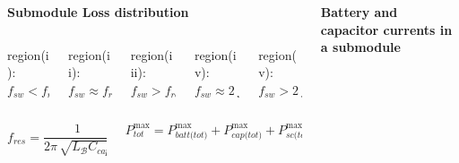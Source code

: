 \documentclass[20pt,t]{beamer}
\begin{document}
\begin{frame}
\begin{columns}[c]
\begin{column}{.49\textwidth}
\begin{beamerboxesrounded}[lower=white,upper=white,shadow=false]{\Large\bfseries Submodule Loss distribution}
\begin{columns}[T]
\begin{column}{0.1\textwidth}
							region(i):
							$f_{\textit{sw}} < f_{\textit{res}}$
						\end{column}
						\begin{column}{0.1\textwidth}
							region(ii):
							$f_{\textit{sw}} \approx f_{\textit{res}}$
						\end{column}
						\begin{column}{0.1\textwidth}
							region(iii):
							$f_{\textit{sw}} > f_{\textit{res}}$
						\end{column}
						\begin{column}{0.1\textwidth}
							region(iv):
							$f_{\textit{sw}} \approx 2\,f_{1}$
						\end{column}
						\begin{column}{0.1\textwidth}
							region(v):
							$f_{\textit{sw}} > 2\,f_{1}$
						\end{column}
					\end{columns}
					\begin{alertblock}{}
						\begin{columns}
							\begin{column}{0.4\textwidth}
								\[ f_{\textit{res}} = \frac{1}{2\pi\,\sqrt{\textit{L}_{\mathcal{B}}\textit{C}_{\textit{cap}}}} \]
							\end{column}
							\begin{column}{0.5\textwidth}
								\[P_{\textit{tot}}^{\textit{$\max{}$}} = P_{\textit{batt(tot)}}^{\textit{$\max{}$}} + P_{\textit{cap(tot)}}^{\textit{$\max{}$}} + P_{\textit{sc(tot)}}^{\textit{$\max{}$}} \]
							\end{column}
						\end{columns}
					\end{alertblock}
				\end{beamerboxesrounded}
			\end{column}
			\begin{column}{.49\textwidth}
				\vspace{2mm}
				\begin{beamerboxesrounded}[lower=white,upper=white,shadow=false]{\Large\bfseries Battery and capacitor currents in a submodule}
					\begin{alertblock}{}
						\begin{columns}[T]
							\begin{column}{0.33\textwidth}

\end{column}
\end{columns}
\end{alertblock}
\end{beamerboxesrounded}
\end{column}
\end{columns}
\end{frame}
\end{document}
